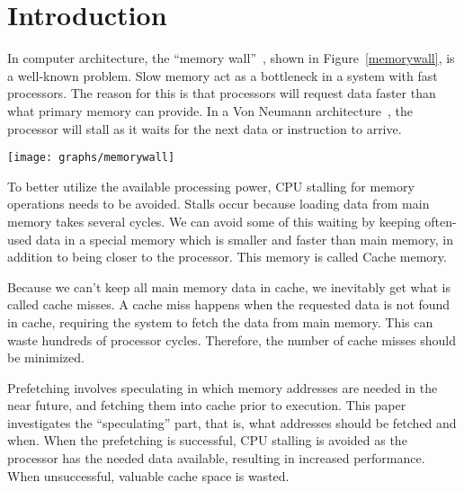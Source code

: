 \section{Introduction} %


In computer architecture, the ``memory wall''~\cite{wulf_mckee_1995},
shown in Figure~\ref{memorywall}, is a well-known problem. Slow memory
act as a bottleneck in a system with fast processors. The reason for
this is that processors will request data faster than what primary
memory can provide. In a Von Neumann architecture~\cite{von1993first},
the processor will stall as it waits for the next data or instruction
to arrive.

\begin{center}
  \texttt{[image: graphs/memorywall]}
  \label{memorywall}
\end{center}

To better utilize the available processing power, CPU stalling for
memory operations needs to be avoided. Stalls occur because loading
data from main memory takes several cycles. We can avoid some of this
waiting by keeping often-used data in a special memory which is
smaller and faster than main memory, in addition to being closer to
the processor. This memory is called Cache memory.

Because we can't keep all main memory data in cache, we inevitably get
what is called cache misses. A cache miss happens when the requested
data is not found in cache, requiring the system to fetch the data
from main memory. This can waste hundreds of processor cycles. Therefore, the
number of cache misses should be minimized.


Prefetching involves speculating in which memory addresses are needed
in the near future, and fetching them into cache prior to
execution. This paper investigates the ``speculating'' part, that is,
what addresses should be fetched and when. When the prefetching is
successful, CPU stalling is avoided as the processor has the needed
data available, resulting in increased performance. When unsuccessful,
valuable cache space is wasted.

